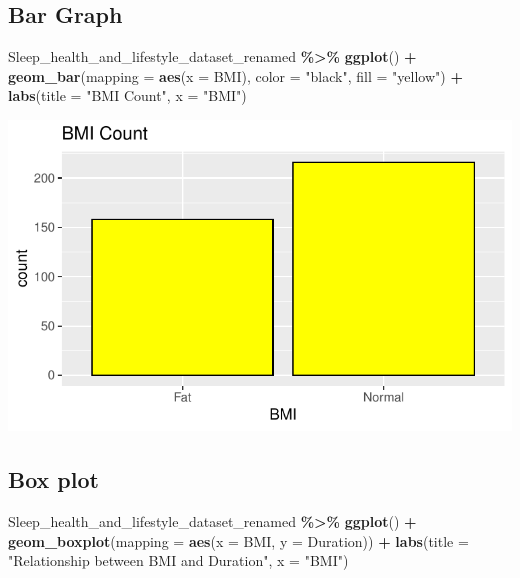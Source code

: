 \documentclass[
  11pt,
]{article}
\newenvironment{Shaded}{\begin{snugshade}}{\end{snugshade}}
\newcommand{\AttributeTok}[1]{\textcolor[rgb]{0.13,0.29,0.53}{#1}}
\newcommand{\FunctionTok}[1]{\textcolor[rgb]{0.13,0.29,0.53}{\textbf{#1}}}
\newcommand{\NormalTok}[1]{#1}
\newcommand{\SpecialCharTok}[1]{\textcolor[rgb]{0.81,0.36,0.00}{\textbf{#1}}}
\newcommand{\StringTok}[1]{\textcolor[rgb]{0.31,0.60,0.02}{#1}}
\begin{document}
\hypertarget{bar-graph}{%
\subsection{Bar Graph}\label{bar-graph}}

\begin{Shaded}
\begin{Highlighting}[]
\NormalTok{Sleep\_health\_and\_lifestyle\_dataset\_renamed }\SpecialCharTok{\%\textgreater{}\%}
  \FunctionTok{ggplot}\NormalTok{() }\SpecialCharTok{+}
    \FunctionTok{geom\_bar}\NormalTok{(}\AttributeTok{mapping =} \FunctionTok{aes}\NormalTok{(}\AttributeTok{x =}\NormalTok{ BMI), }\AttributeTok{color =} \StringTok{"black"}\NormalTok{, }\AttributeTok{fill =} \StringTok{"yellow"}\NormalTok{) }\SpecialCharTok{+}
    \FunctionTok{labs}\NormalTok{(}\AttributeTok{title =} \StringTok{"BMI Count"}\NormalTok{, }\AttributeTok{x =} \StringTok{"BMI"}\NormalTok{)}
\end{Highlighting}
\end{Shaded}

\begin{center}\includegraphics[width=0.7\linewidth]{SleepHelath_files/figure-latex/unnamed-chunk-20-1} \end{center}

\hypertarget{box-plot-1}{%
\subsection{Box plot}\label{box-plot-1}}

\begin{Shaded}
\begin{Highlighting}[]
\NormalTok{Sleep\_health\_and\_lifestyle\_dataset\_renamed }\SpecialCharTok{\%\textgreater{}\%}
  \FunctionTok{ggplot}\NormalTok{() }\SpecialCharTok{+}
    \FunctionTok{geom\_boxplot}\NormalTok{(}\AttributeTok{mapping =} \FunctionTok{aes}\NormalTok{(}\AttributeTok{x =}\NormalTok{ BMI, }\AttributeTok{y =}\NormalTok{ Duration)) }\SpecialCharTok{+}
    \FunctionTok{labs}\NormalTok{(}\AttributeTok{title =} \StringTok{"Relationship between BMI and Duration"}\NormalTok{, }\AttributeTok{x =} \StringTok{"BMI"}\NormalTok{)}
\end{Highlighting}
\end{Shaded}
\end{document}
